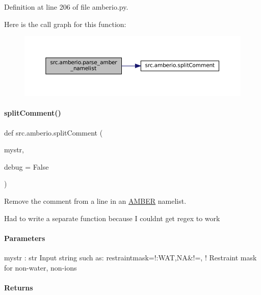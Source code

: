 Definition at line 206 of file amberio.\+py.

Here is the call graph for this function\+:
\nopagebreak
\begin{figure}[H]
\begin{center}
\leavevmode
\includegraphics[width=350pt]{namespacesrc_1_1amberio_a526ac77cde3d083631db82b2d229d2db_cgraph}
\end{center}
\end{figure}
\mbox{\label{namespacesrc_1_1amberio_ab145e7dc869bc06009b5f5cf0208bb77}} 
\paragraph{\texorpdfstring{split\+Comment()}{splitComment()}}
{\footnotesize\ttfamily def src.\+amberio.\+split\+Comment (\begin{DoxyParamCaption}\item[{}]{mystr,  }\item[{}]{debug = {\ttfamily False} }\end{DoxyParamCaption})}



Remove the comment from a line in an \hyperlink{classsrc_1_1amberio_1_1AMBER}{A\+M\+B\+ER} namelist. 

Had to write a separate function because I couldn\textquotesingle{}t get regex to work

\paragraph*{Parameters }

mystr \+: str Input string such as\+: restraintmask=\textquotesingle{}!\+:W\+AT,NA\&!=\textquotesingle{}, ! Restraint mask for non-\/water, non-\/ions

\paragraph*{Returns }


